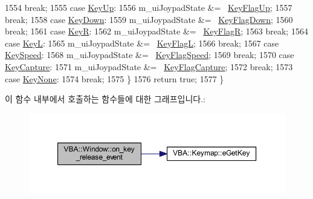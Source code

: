 \begin{DoxyCode}
1554     \textcolor{keywordflow}{break};
1555   \textcolor{keywordflow}{case} \mbox{\hyperlink{class_v_b_a_a5839ea5408735bd8ce070c4c245750ccaf15bb7d949826d0445e598c6f57e892c}{KeyUp}}:
1556     m\_uiJoypadState &= ~\mbox{\hyperlink{class_v_b_a_a20a8479ee93dc52b1fbd911a13cb30a5a02b1e23bde2f5e6241fd64069322d05c}{KeyFlagUp}};
1557     \textcolor{keywordflow}{break};
1558   \textcolor{keywordflow}{case} \mbox{\hyperlink{class_v_b_a_a5839ea5408735bd8ce070c4c245750cca147b673477c3629369ea4247f5c0a091}{KeyDown}}:
1559     m\_uiJoypadState &= ~\mbox{\hyperlink{class_v_b_a_a20a8479ee93dc52b1fbd911a13cb30a5a84eb49bded085472c16fc080c423be90}{KeyFlagDown}};
1560     \textcolor{keywordflow}{break};
1561   \textcolor{keywordflow}{case} \mbox{\hyperlink{class_v_b_a_a5839ea5408735bd8ce070c4c245750cca3a8e26b65f48c10474336241f9c546c7}{KeyR}}:
1562     m\_uiJoypadState &= ~\mbox{\hyperlink{class_v_b_a_a20a8479ee93dc52b1fbd911a13cb30a5ae74198fb73e9b0d06aca1dedcac42732}{KeyFlagR}};
1563     \textcolor{keywordflow}{break};
1564   \textcolor{keywordflow}{case} \mbox{\hyperlink{class_v_b_a_a5839ea5408735bd8ce070c4c245750cca3748b8c565a3c267316531f7a9f783b4}{KeyL}}:
1565     m\_uiJoypadState &= ~\mbox{\hyperlink{class_v_b_a_a20a8479ee93dc52b1fbd911a13cb30a5ad04b7c8e1cf8bb6053010c681bfa253d}{KeyFlagL}};
1566     \textcolor{keywordflow}{break};
1567   \textcolor{keywordflow}{case} \mbox{\hyperlink{class_v_b_a_a5839ea5408735bd8ce070c4c245750cca885e1eaec5c49b6b0390828126f43a1d}{KeySpeed}}:
1568     m\_uiJoypadState &= ~\mbox{\hyperlink{class_v_b_a_a20a8479ee93dc52b1fbd911a13cb30a5a27ccfb3e8dfb99a74170dacd35b3f4df}{KeyFlagSpeed}};
1569     \textcolor{keywordflow}{break};
1570   \textcolor{keywordflow}{case} \mbox{\hyperlink{class_v_b_a_a5839ea5408735bd8ce070c4c245750cca526bd10ceb184276281299f7ebcc90c8}{KeyCapture}}:
1571     m\_uiJoypadState &= ~\mbox{\hyperlink{class_v_b_a_a20a8479ee93dc52b1fbd911a13cb30a5a5413c49ad0399cb0372eba4b7bf24dfc}{KeyFlagCapture}};
1572     \textcolor{keywordflow}{break};
1573   \textcolor{keywordflow}{case} \mbox{\hyperlink{class_v_b_a_a5839ea5408735bd8ce070c4c245750cca183553ab4e5da29f6cda581728067223}{KeyNone}}:
1574     \textcolor{keywordflow}{break};
1575   \}
1576   \textcolor{keywordflow}{return} \textcolor{keyword}{true};
1577 \}
\end{DoxyCode}
이 함수 내부에서 호출하는 함수들에 대한 그래프입니다.\+:
\nopagebreak
\begin{figure}[H]
\begin{center}
\leavevmode
\includegraphics[width=350pt]{class_v_b_a_1_1_window_af7c7628164d393dd278503b1d95298fa_cgraph}
\end{center}
\end{figure}
